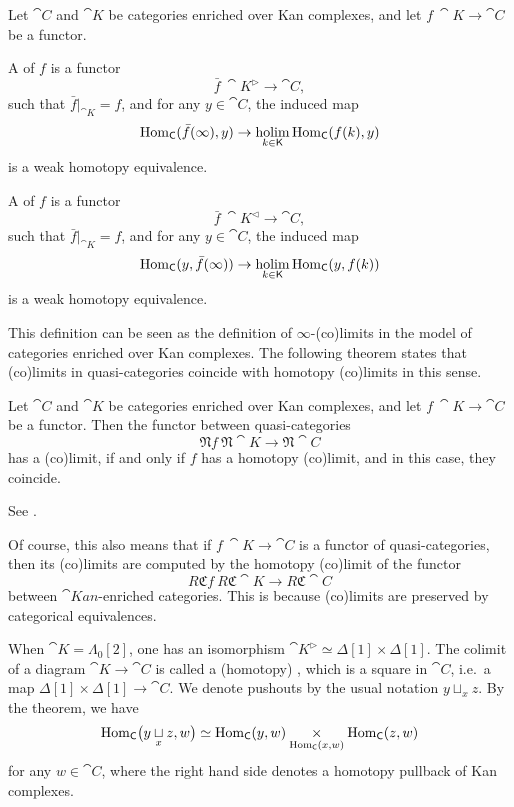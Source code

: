 \begin{definition}
    Let $\cat C$ and $\cat K$ be categories enriched over Kan complexes,
    and let $f\:\cat K\to\cat C$ be a functor.
    \begin{itms}
        \item A  of $f$ is a functor 
        \[ \bar f\:\cat K^\vartriangleright\to\cat C, \]
        such that $\bar f|_{\cat K}=f$, and for any $y\in\cat C$, the induced map 
        \[ \operatorname{Hom}_{\mathsf{C}}(\bar f(\infty),y)\to\mathop{\operatorname{holim}}\limits_{k\in\mathsf{K}}\operatorname{Hom}_{\mathsf{C}}(f(k),y) \]
        is a weak homotopy equivalence.

        \item A  of $f$ is a functor 
        \[ \bar f\:\cat K^\vartriangleleft\to\cat C, \]
        such that $\bar f|_{\cat K}=f$, and for any $y\in\cat C$, the induced map 
        \[ \operatorname{Hom}_{\mathsf{C}}(y,\bar f(\infty))\to\mathop{\operatorname{holim}}\limits_{k\in\mathsf{K}}\operatorname{Hom}_{\mathsf{C}}(y,f(k)) \]
        is a weak homotopy equivalence.
    \end{itms}
\end{definition}

This definition can be seen as the definition of $\infty$-(co)limits 
in the model of categories enriched over Kan complexes.
The following theorem states that
(co)limits in quasi-categories coincide with homotopy (co)limits in this sense.

\begin{theorem}
    Let $\cat C$ and $\cat K$ be categories enriched over Kan complexes,
    and let $f\:\cat K\to\cat C$ be a functor.
    Then the functor between quasi-categories
    \[ \mathfrak Nf\:\mathfrak N\cat K\to\mathfrak N\cat C \]
    has a (co)limit,
    if and only if $f$ has a homotopy (co)limit,
    and in this case, they coincide.
\end{theorem}

See \cite[Theorem~4.2.4.1]{htt}.

Of course, this also means that if $f\:\cat K\to\cat C$
is a functor of quasi-categories, then its (co)limits are computed by
the homotopy (co)limit of the functor
\[ R\mathfrak Cf\:R\mathfrak C\cat K\to R\mathfrak C\cat C \]
between $\cat{Kan}$-enriched categories.
This is because (co)limits are preserved by categorical equivalences.

\begin{example}
    When $\cat K=\Lambda_0[2]$, one has an isomorphism
    $\cat K^\vartriangleright\simeq\Delta[1]\times\Delta[1]$.
    The colimit of a diagram $\cat K\to\cat C$ is called a (homotopy) ,
    which is a square in $\cat C$, i.e.\ a map $\Delta[1]\times\Delta[1]\to\cat C$.
    We denote pushouts by the usual notation $y\sqcup_xz$.
    By the theorem, we have 
    \[ \operatorname{Hom}_{\mathsf{C}}\bigl(y\underset{x}{\sqcup}z,w\bigr)\simeq
    \operatorname{Hom}_{\mathsf{C}}(y,w)\underset{\operatorname{Hom}_{\mathsf{C}}(x,w)}{\times}\operatorname{Hom}_{\mathsf{C}}(z,w) \]
    for any $w\in\cat C$,
    where the right hand side denotes a homotopy pullback of Kan complexes. 
    \varqed
\end{example}

